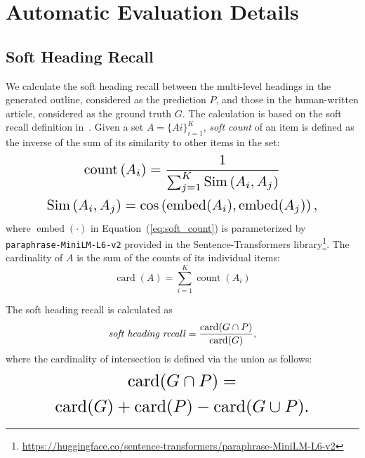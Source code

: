 \documentclass[11pt]{article}
\newcommand{\refequ}[1]{Equation~(\ref{#1})}
\begin{document}
\section{Automatic Evaluation Details}
\subsection{Soft Heading Recall}
\label{appendix:soft_heading_recall}
We calculate the soft heading recall between the multi-level headings in the generated outline, considered as the prediction $P$, and those in the human-written article, considered as the ground truth $G$. The calculation is based on the soft recall definition in~\citet{franti2023soft}. Given a set $A=\{Ai\}_{i=1}^K$, \textit{soft count} of an item is defined as the inverse of the sum of its similarity to other items in the set:
\begin{equation}
\resizebox{0.8\columnwidth}{!}{$%
\begin{gathered}
    \operatorname{count}\left(A_i\right)=\frac{1}{\sum_{j=1}^K \operatorname{Sim}\left(A_i, A_j\right)} \\
    \operatorname{Sim}\left(A_i, A_j\right) = \operatorname{cos}\left(\operatorname{embed}(A_i), \operatorname{embed}(A_j)\right),
\end{gathered}$%
}
\label{eq:soft_count}
\end{equation}
where $\operatorname{embed}(\cdot)$ in \refequ{eq:soft_count} is parameterized by \texttt{paraphrase-MiniLM-L6-v2} provided in the Sentence-Transformers library\footnote{\url{https://huggingface.co/sentence-transformers/paraphrase-MiniLM-L6-v2}}. The cardinality of $A$ is the sum of the counts of its individual items:
\begin{equation}
    \operatorname{card}(A)=\sum_{i=1}^K \operatorname{count}\left(A_i\right)
\end{equation}


The soft heading recall is calculated as
\begin{equation}
    \text{\textit{soft heading recall}} = \frac{\operatorname{card}(G \cap P)}{\operatorname{card}(G)},
\end{equation}
where the cardinality of intersection is defined via the union as follows:
\begin{equation}
\resizebox{0.75\columnwidth}{!}{$%
\begin{gathered}
    \operatorname{card}(G \cap P)=\\ \operatorname{card}(G)+\operatorname{card}(P)-\operatorname{card}(G \cup P).
\end{gathered}$%
}
\end{equation}
\end{document}
